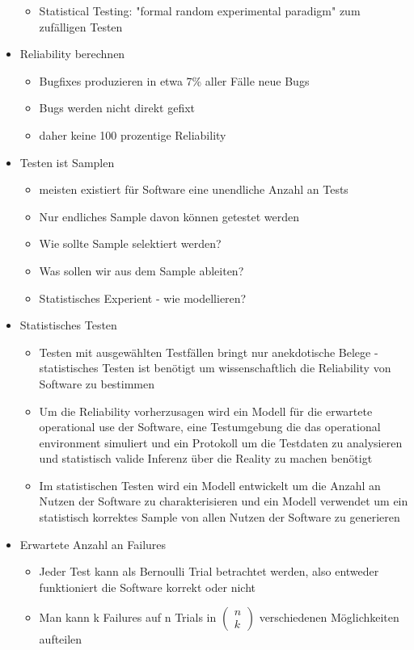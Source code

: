 \documentclass[paper=a4, fontsize=11pt]{scrartcl} %
\numberwithin{equation}{section} %
\numberwithin{figure}{section} %
\numberwithin{table}{section} %
\begin{document}
\begin{itemize}
\begin{itemize}
    \item Statistical Testing: "formal random experimental paradigm" zum zufälligen Testen
  \end{itemize}
  \item Reliability berechnen
  \begin{itemize}
    \item Bugfixes produzieren in etwa 7\% aller Fälle neue Bugs
    \item Bugs werden nicht direkt gefixt
    \item daher keine 100 prozentige Reliability
  \end{itemize}
  \item Testen ist Samplen
  \begin{itemize}
    \item meisten existiert für Software eine unendliche Anzahl an Tests
    \item Nur endliches Sample davon können getestet werden
    \item Wie sollte Sample selektiert werden?
    \item Was sollen wir aus dem Sample ableiten?
    \item Statistisches Experient - wie modellieren?
  \end{itemize}
  \item Statistisches Testen
  \begin{itemize}
    \item Testen mit ausgewählten Testfällen bringt nur anekdotische Belege - statistisches Testen ist benötigt um wissenschaftlich die Reliability von Software zu bestimmen
    \item Um die Reliability vorherzusagen wird ein Modell für die erwartete operational use der Software, eine Testumgebung die das operational environment simuliert und ein Protokoll um die Testdaten zu analysieren und statistisch valide Inferenz über die Reality zu machen benötigt
    \item Im statistischen Testen wird ein Modell entwickelt um die Anzahl an Nutzen der Software zu charakterisieren und ein Modell verwendet um ein statistisch korrektes Sample von allen Nutzen der Software zu generieren
  \end{itemize}
  \item Erwartete Anzahl an Failures
  \begin{itemize}
    \item Jeder Test kann als Bernoulli Trial betrachtet werden, also entweder funktioniert die Software korrekt oder nicht
    \item Man kann k Failures auf n Trials in $\begin{pmatrix}n \\k \end{pmatrix}$ verschiedenen Möglichkeiten aufteilen

\end{itemize}
\end{itemize}
\end{document}
